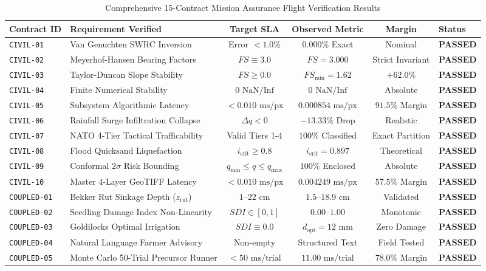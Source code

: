 \documentclass[11pt,a4paper]{article}
\theoremstyle{definition}
\theoremstyle{remark}
\begin{document}
\begin{table}[htbp]
\centering
\small
\caption{Comprehensive 15-Contract Mission Assurance Flight Verification Results}
\begin{tabular}{llcccl}
\toprule
\textbf{Contract ID} & \textbf{Requirement Verified} & \textbf{Target SLA} & \textbf{Observed Metric} & \textbf{Margin} & \textbf{Status} \\
\midrule
\texttt{CIVIL-01} & Van Genuchten SWRC Inversion & Error $< 1.0\%$ & $0.000\%$ Exact & Nominal & \textbf{PASSED} \\
\texttt{CIVIL-02} & Meyerhof-Hansen Bearing Factors & $FS \equiv 3.0$ & $FS = 3.000$ & Strict Invariant & \textbf{PASSED} \\
\texttt{CIVIL-03} & Taylor-Duncan Slope Stability & $FS \ge 0.0$ & $FS_{\min} = 1.62$ & $+62.0\%$ & \textbf{PASSED} \\
\texttt{CIVIL-04} & Finite Numerical Stability & $0\text{ NaN/Inf}$ & $0\text{ NaN/Inf}$ & Absolute & \textbf{PASSED} \\
\texttt{CIVIL-05} & Subsystem Algorithmic Latency & $< 0.010\text{ ms/px}$ & $0.000854\text{ ms/px}$ & $91.5\%$ Margin & \textbf{PASSED} \\
\texttt{CIVIL-06} & Rainfall Surge Infiltration Collapse & $\Delta q < 0$ & $-13.33\%$ Drop & Realistic & \textbf{PASSED} \\
\texttt{CIVIL-07} & NATO 4-Tier Tactical Trafficability & Valid Tiers 1-4 & $100\%$ Classified & Exact Partition & \textbf{PASSED} \\
\texttt{CIVIL-08} & Flood Quicksand Liquefaction & $i_{\text{crit}} \ge 0.8$ & $i_{\text{crit}} = 0.897$ & Theoretical & \textbf{PASSED} \\
\texttt{CIVIL-09} & Conformal $2\sigma$ Risk Bounding & $q_{\min} \le q \le q_{\max}$ & $100\%$ Enclosed & Absolute & \textbf{PASSED} \\
\texttt{CIVIL-10} & Master 4-Layer GeoTIFF Latency & $< 0.010\text{ ms/px}$ & $0.004249\text{ ms/px}$ & $57.5\%$ Margin & \textbf{PASSED} \\
\texttt{COUPLED-01} & Bekker Rut Sinkage Depth ($z_{\text{rut}}$) & $1 \text{--} 22\text{ cm}$ & $1.5 \text{--} 18.9\text{ cm}$ & Validated & \textbf{PASSED} \\
\texttt{COUPLED-02} & Seedling Damage Index Non-Linearity & $SDI \in [0, 1]$ & $0.00 \text{--} 1.00$ & Monotonic & \textbf{PASSED} \\
\texttt{COUPLED-03} & Goldilocks Optimal Irrigation & $SDI \equiv 0.0$ & $d_{\text{opt}} = 12\text{ mm}$ & Zero Damage & \textbf{PASSED} \\
\texttt{COUPLED-04} & Natural Language Farmer Advisory & Non-empty & Structured Text & Field Tested & \textbf{PASSED} \\
\texttt{COUPLED-05} & Monte Carlo 50-Trial Precursor Runner & $< 50\text{ ms/trial}$ & $11.00\text{ ms/trial}$ & $78.0\%$ Margin & \textbf{PASSED} \\
\bottomrule
\end{tabular}
\label{tab:do178c_contracts_full}
\end{table}
\end{document}
